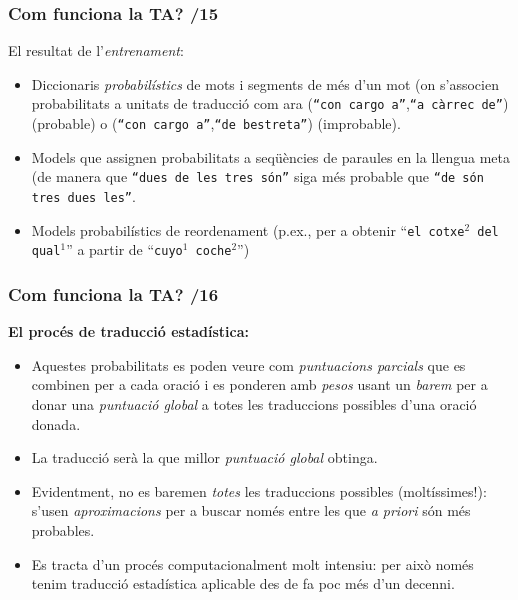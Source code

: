 \documentclass{beamer}
\newcommand{\tu}[2]{(\texttt{``#1''},\texttt{``#2''})}
\newcommand{\empha}[1]{\emph{#1}\/}
\begin{document}
\begin{frame}
 \frametitle{Com funciona la TA? /15}

El resultat de l'\empha{entrenament}:
\begin{itemize}
\item Diccionaris \emph{probabilístics} de mots i segments de més d'un mot (on s'associen probabilitats a unitats de traducció com ara \tu{con cargo a}{a càrrec de} (probable) o \tu{con cargo a}{de bestreta} (improbable).
\item Models que assignen probabilitats a seqüències de paraules en la llengua meta (de manera que \texttt{``dues de les tres són''} siga més probable que \texttt{``de són tres dues les''}.
\item Models probabilístics de reordenament (p.ex., per a obtenir ``\texttt{el cotxe\(^2\) del qual\(^1\)}'' a partir de ``\texttt{cuyo\(^1\) coche\(^2\)}'')
\end{itemize}

\end{frame}
\begin{frame}
 \frametitle{Com funciona la TA? /16}

\textbf{El procés de traducció estadística:}

\begin{itemize}
\item Aquestes probabilitats es poden veure com \empha{puntuacions
    parcials} que es combinen per a cada oració i es ponderen amb
  \empha{pesos} usant un \empha{barem} per a donar una
  \empha{puntuació global} a totes les traduccions possibles d'una
  oració donada.
\item La traducció serà la que millor \empha{puntuació global} obtinga.
\item Evidentment, no es baremen \empha{totes} les traduccions possibles (moltíssimes!): s'usen \emph{aproximacions} per a buscar només entre les que \emph{a priori} són més
probables.
\item Es tracta d'un procés computacionalment molt intensiu: per això només tenim traducció estadística aplicable des de fa poc més d'un decenni.
\end{itemize}

\end{frame}
\end{document}

